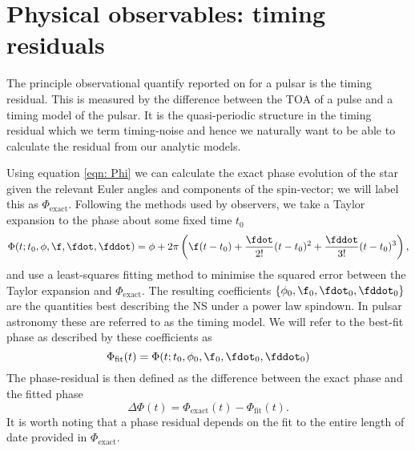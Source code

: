 \documentclass[/home/greg/Thesis/main/main.tex]{subfiles}
\begin{document}
\graphicspath{{/home/greg/Neutron_star_modelling/TimingResiduals/img/}}

\newcommand{\Phiexact}{\Phi_{\mathrm{exact}}}
\newcommand{\Phifit}{\Phi_{\mathrm{fit}}}
\newcommand{\wobbleangle}{\tilde{\theta}}
\FloatBarrier

\section{Physical observables: timing residuals}
The principle observational quantify reported on for a pulsar is the timing 
residual. This is measured by the difference between the TOA of a pulse and
a timing model of the pulsar. It is the quasi-periodic structure in
the timing residual which we term timing-noise and hence we naturally want 
to be able to calculate the residual from our analytic models.

Using equation \eqref{eqn: Phi} we can calculate the exact phase evolution of
the star given the relevant Euler angles and components of the spin-vector; we
will label this as $\Phiexact$. Following the methods used by observers, we
take a Taylor expansion to the phase about some fixed time $t_{0}$
\begin{equation}
    \Phi(t; t_{0}, \phi, \f, \fdot, \fddot) = 
    \phi + 2\pi \left(\f(t - t_{0}) + 
                          \frac{\fdot}{2!}(t-t_{0})^{2} +
                          \frac{\fddot}{3!}(t-t_{0})^{3} 
                          \right),
\label{eqn: TR taylor expansion} 
\end{equation}
and use a least-squares fitting method to minimise the squared error between
the Taylor expansion and $\Phiexact$. The resulting coefficients $\{\phi_{0},
\f_{0}, \fdot_{0}, \fddot_{0}\}$ are the quantities best describing the NS
under a power law spindown. In pulsar astronomy these are referred to as the
timing model. We will refer to the best-fit phase as described by  these
coefficients as
\begin{equation}
    \Phifit(t) = \Phi(t; t_{0}, \phi_{0}, \f_{0}, \fdot_{0}, \fddot_{0})
\end{equation}
The phase-residual is then defined as the difference between the exact phase 
and the fitted phase
\begin{equation}
  \Delta\Phi(t) = \Phiexact(t) - \Phifit(t).
\end{equation}
It is worth noting that a phase residual depends on the fit to the entire
length of date provided in $\Phiexact$. 
\end{document}
